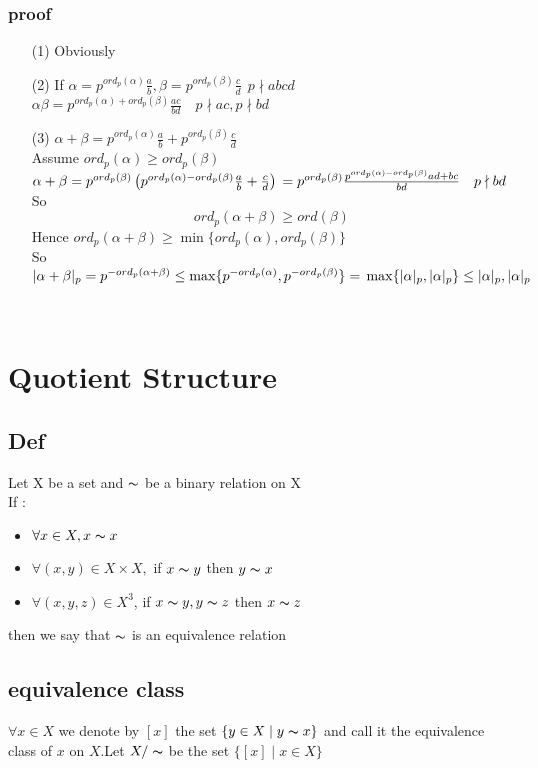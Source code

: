 \documentclass{book}
\begin{document}
\subsection{proof}
\begin{itemize}
    \item [(1)] Obviously
    \item [(2)]If $\alpha=p^{ord_p(\alpha)}\frac{a}{b},\beta=p^{ord_p(\beta)}\frac{c}{d}\ \ p\nmid abcd$\\$\alpha\beta=p^{ord_p(\alpha)+ord_p(\beta)}\frac{ac}{bd}\quad p\nmid ac,p\nmid bd$
    \item [(3)]$\alpha+\beta=p^{ord_p(\alpha)}\frac{a}{b}+p^{ord_p(\beta)}\frac{c}{d}$\\Assume $ord_p(\alpha)\geq ord_p(\beta)$\\$\alpha+\beta\\=p^{ord_p(\beta)}\left(p^{ord_p(\alpha)-ord_p(\beta)}\frac{a}{b}+\frac{c}{d}\right)\\=p^{ord_p(\beta)}\frac{p^{ord_p(\alpha)-ord_p(\beta)}ad+bc}{bd}\quad p\nmid bd$\\So $$ord_p(\alpha+\beta)\geq ord(\beta)$$
    Hence $ord_p(\alpha+\beta)\geq \min\{ord_p(\alpha),ord_p(\beta)\}$\\So $\lvert\alpha+\beta\rvert _p=p^{-ord_p(\alpha+\beta)}\leq\max\{p^{-ord_p(\alpha)},p^{-ord_p(\beta)}\}=\\\max\{\lvert \alpha\rvert _p,\lvert \alpha\rvert _p\}\leq\lvert \alpha\rvert _p,\lvert \alpha\rvert _p $
\end{itemize}\
\chapter{Quotient Structure}
\section{Def}

Let X be a set and $\thicksim$  be a binary relation on X\\
If :\begin{itemize}
    \item $\forall x\in X,x\thicksim x$
    \item $\forall (x,y)\in X\times X,$ if $x\thicksim y$ then $y\thicksim x$
    \item $\forall (x,y,z)\in X^3$, if $x\thicksim y,y\thicksim z$ then $x\thicksim z$
\end{itemize}
then we say that $\thicksim$  is an equivalence relation
\section{equivalence class}
$\forall x\in X$ we denote by $[x]$ the set $\{y\in X\mid y\thicksim x\}$ and call it the equivalence class of $x$ on $X$.Let $X/\thicksim $ be the set $\{[x]\mid x\in X\}$
\end{document}
